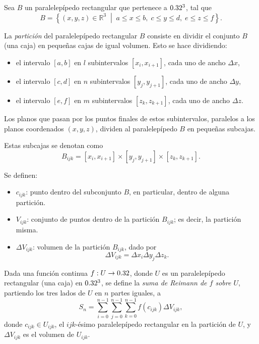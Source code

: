 \begin{definition}	
Sea \( B \) un paralelepípedo rectangular que pertenece a \( 0.32^3 \), tal que    
\[
B = \left\{ (x, y, z) \in \mathbb{R}^3 \;\middle|\; a \leq x \leq b,\; c \leq y \leq d,\; e \leq z \leq f \right\}.
\]
\end{definition}

La \textit{partición} del paralelepípedo rectangular \( B \) consiste en dividir el conjunto \( B \) (una caja) en pequeñas cajas de igual volumen. Esto se hace dividiendo:
\begin{itemize}
    \item el intervalo \( [a, b] \) en \( l \) subintervalos \( [x_i, x_{i+1}] \), cada uno de ancho \( \Delta x \),
    \item el intervalo \( [c, d] \) en \( n \) subintervalos \( [y_j, y_{j+1}] \), cada uno de ancho \( \Delta y \),
    \item el intervalo \( [e, f] \) en \( m \) subintervalos \( [z_k, z_{k+1}] \), cada uno de ancho \( \Delta z \).
\end{itemize}



Los planos que pasan por los puntos finales de estos subintervalos, paralelos a los planos coordenados \( (x, y, z) \), dividen al paralelepípedo \( B \) en pequeñas subcajas.

Estas subcajas se denotan como
\[
B_{ijk} = [x_i, x_{i+1}] \times [y_j, y_{j+1}] \times [z_k, z_{k+1}].
\]

Se definen:

\begin{itemize}
    \item \( c_{ijk} \): punto dentro del subconjunto \( B \), en particular, dentro de alguna partición.
    \item \( V_{ijk} \): conjunto de puntos dentro de la partición \( B_{ijk} \); es decir, la partición misma.
    \item \( \Delta V_{ijk} \): volumen de la partición \( B_{ijk} \), dado por
    \[
    \Delta V_{ijk} = \Delta x_i\Delta y_j\Delta z_k.
    \]
\end{itemize}

\begin{definition}
Dada una funci\'on continua $f:U\to0.32$, donde $U$ es un paralelep\'ipedo rectangular (una caja) en $0.32^3$, se define la \emph{suma de Reimann de $f$ sobre $U$}, partiendo los tres lados de $U$ en $n$ partes iguales, a
\[
    S_n=\sum_{i=0}^{n-1}\sum_{j=0}^{n-1}\sum_{k=0}^{n-1}f(c_{ijk})\Delta V_{ijk},
\]  
donde $c_{ijk}\in U_{ijk}$, el $ijk$-\'esimo paralelep\'ipedo rectangular en la partici\'on de $U$, y $\Delta V_{ijk}$ es el volumen de $U_{ijk}$.
\end{definition}

